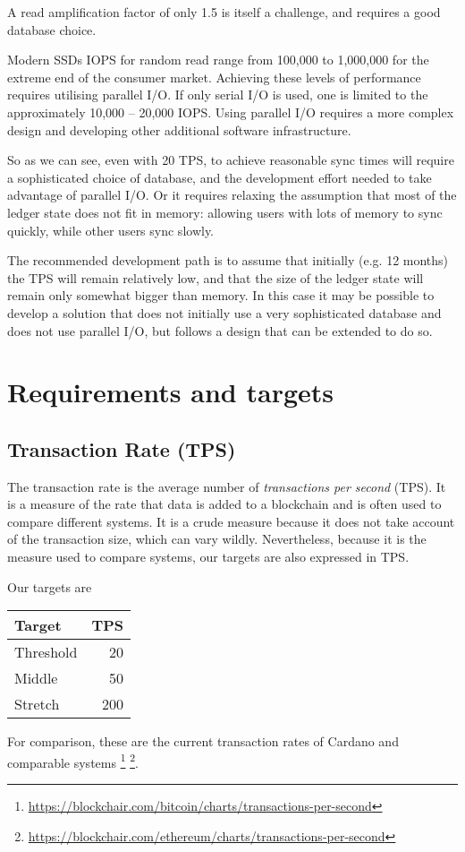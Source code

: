 \documentclass[11pt,a4paper]{article}
\begin{document}
A read amplification factor of only 1.5 is itself a challenge, and requires a
good database choice.

Modern SSDs IOPS for random read range from 100,000 to 1,000,000 for the
extreme end of the consumer market. Achieving these levels of performance
requires utilising parallel I/O. If only serial I/O is used, one is limited to
the approximately 10,000 -- 20,000 IOPS. Using parallel I/O requires a more
complex design and developing other additional software infrastructure.

So as we can see, even with 20 TPS, to achieve reasonable sync times will
require a sophisticated choice of database, and the development effort needed
to take advantage of parallel I/O. Or it requires relaxing the assumption that
most of the ledger state does not fit in memory: allowing users with lots of
memory to sync quickly, while other users sync slowly.

The recommended development path is to assume that initially (e.g. 12 months)
the TPS will remain relatively low, and that the size of the ledger state will
remain only somewhat bigger than memory. In this case it may be possible to
develop a solution that does not initially use a very sophisticated database
and does not use parallel I/O, but follows a design that can be extended to do
so.

\section{Requirements and targets}
\label{requirements}

\subsection{Transaction Rate (TPS)}

The transaction rate is the average number of \emph{transactions per second}
(TPS). It is a measure of the rate that data is added to a blockchain and is
often used to compare different systems. It is a crude measure because it does
not take account of the transaction size, which can vary wildly. Nevertheless,
because it is the measure used to compare systems, our targets are also
expressed in TPS.

Our targets are

\begin{center}
\begin{tabular}[]{lr}
  Target    & TPS \\
  \toprule
  Threshold &  20 \\
  Middle    &  50 \\
  Stretch   & 200
\end{tabular}
\end{center}
%
For comparison, these are the current transaction rates of Cardano and
comparable systems%
\footnote{\url{https://blockchair.com/bitcoin/charts/transactions-per-second}}%
\footnote{\url{https://blockchair.com/ethereum/charts/transactions-per-second}}.
\end{document}
